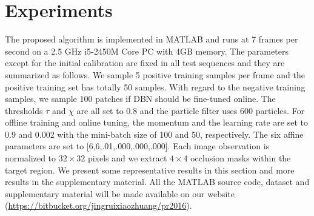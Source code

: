 \documentclass[preprint,12pt,review]{elsarticle}
\begin{document}
\section{Experiments}
The proposed algorithm is implemented in MATLAB and runs at 7 frames per second on a 2.5 GHz i5-2450M Core PC with 4GB memory.
The parameters except for the initial calibration are fixed in all test sequences and they are summarized as follows.
We sample 5 positive training samples per frame and the positive training set has totally 50 samples.
With regard to the negative training samples, we sample 100 patches if DBN should be fine-tuned online.
The thresholds $ \tau $ and $\chi$ are all set to 0.8 and the particle filter uses 600 particles.
For offline training and online tuning, the momentum and the learning rate are set to 0.9 and 0.002 with the mini-batch size of 100 and 50, respectively.
The six affine parameters are set to [6,6,.01,.000,.000,.000].
Each image observation is normalized to $32 \times 32$ pixels and we extract $4 \times 4$ occlusion masks within the target region.
We present some representative results in this section and more results in the supplementary material.
All the MATLAB source code, dataset and supplementary material will be made available on
our website ({\small {\url{https://bitbucket.org/jingruixiaozhuang/pr2016}}}).
\end{document}
